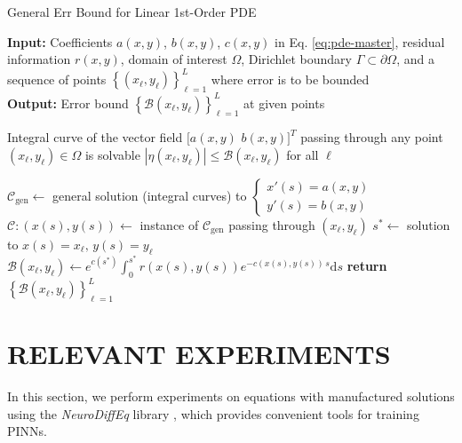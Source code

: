 \documentclass[accepted]{uai2023}
\newcommand{\Err}{\eta}
\newcommand{\Bound}{\mathcal{B}}
\begin{document}
    \begin{algorithm}
        \small
        \caption{General Err Bound for Linear 1st-Order PDE}\label{alg:linear-first-order-pde-general}
        \textbf{Input:} Coefficients $a(x, y)$, $b(x, y)$, $c(x, y)$ in Eq. \ref{eq:pde-master}, residual information $r(x, y)$, domain of interest $\Omega$, Dirichlet boundary $\Gamma\subset \partial \Omega$, and a sequence of points $\left\{(x_\ell, y_\ell)\right\}_{\ell=1}^{L}$ where error is to be bounded\\
        \textbf{Output:} Error bound $\left\{\Bound(x_\ell, y_\ell)\right\}_{\ell=1}^{L}$ at given points
        \begin{algorithmic}
            \Require Integral curve of the vector field $\big[a(x, y)\,\, b(x, y)\big]^T$ passing through any point $(x_\ell, y_\ell) \in \Omega$ is solvable
            \Ensure $|\Err(x_\ell, y_\ell)| \leq \Bound(x_\ell, y_\ell)$ for all $\ell$

            \State $\mathcal{C}_{\text{gen}} \gets $ general solution (integral curves) to {\smaller $\begin{cases}x'(s) = a(x, y) \\ y'(s) = b(x, y)\end{cases}$}
                \State $\mathcal{C}:(x(s), y(s))\gets$ instance of $\mathcal{C}_{\text{gen}}$ passing through $(x_\ell, y_\ell)$
                \State $s^* \gets$ solution to $x(s) = x_\ell,\, y(s)=y_\ell$
                \State $\displaystyle \Bound(x_\ell, y_\ell) \gets e^{c(s^*)}\int_{0}^{s^*}r(x(s), y(s)) e^{-c(x(s),y(s))\,s}\mathrm{d}s$ 
            \EndFor
            \State \textbf{return} $\left\{\Bound(x_\ell, y_\ell)\right\}_{\ell=1}^{L}$
        \end{algorithmic}
    \end{algorithm}

\section{RELEVANT EXPERIMENTS}\label{section:experiments}
    In this section, we perform experiments on equations with manufactured solutions using the \textit{NeuroDiffEq} library \citep{chen2020neurodiffeq}, which provides convenient tools for training PINNs. 
\end{document}
